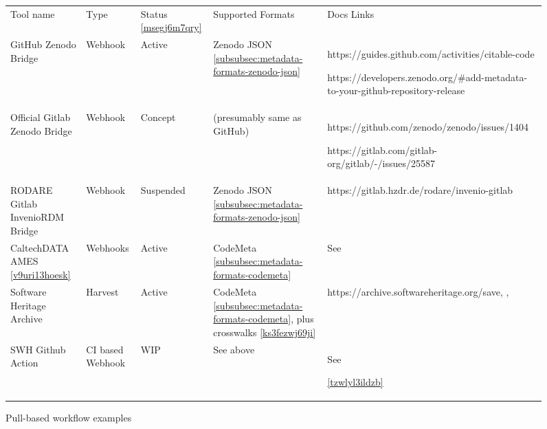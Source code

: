 \documentclass{article}
\begin{document}
\begin{figure}
\begin{tabular}{*5{l}}
Tool name

& Type

& Status \ref{msegj6m7qry}

& Supported Formats

& Docs Links

\\
GitHub Zenodo Bridge

& Webhook

& Active

& Zenodo JSON \ref{subsubsec:metadata-formats-zenodo-json}

& https://guides.github.com/activities/citable-code

https://developers.zenodo.org/\#add-metadata-to-your-github-repository-release

\\
Official Gitlab Zenodo Bridge

& Webhook

& Concept

& (presumably same as GitHub)

& https://github.com/zenodo/zenodo/issues/1404

https://gitlab.com/gitlab-org/gitlab/-/issues/25587

\\
RODARE Gitlab InvenioRDM Bridge

& Webhook

& Suspended

& Zenodo JSON \ref{subsubsec:metadata-formats-zenodo-json}

& https://gitlab.hzdr.de/rodare/invenio-gitlab

\\
CaltechDATA AMES \ref{v9uri13hoesk}

& Webhooks

& Active

& CodeMeta \ref{subsubsec:metadata-formats-codemeta}

& See \cite{11045035/44KEF4EY}

\\
Software Heritage Archive

& Harvest

& Active

& CodeMeta \ref{subsubsec:metadata-formats-codemeta}, plus crosswalks \ref{ks3fezwj69ji}

& https://archive.softwareheritage.org/save, \cite{11045035/7EDI2C4A}, \cite{11045035/FYSTKDUI}

\\
SWH Github Action

& CI based Webhook

& WIP

& See above

& See 

\ref{tzwlyl3ildzb}

\\
\end{tabular}
\caption{Pull-based workflow examples}
\label{dououxj84y9j}
\end{figure}
\end{document}
